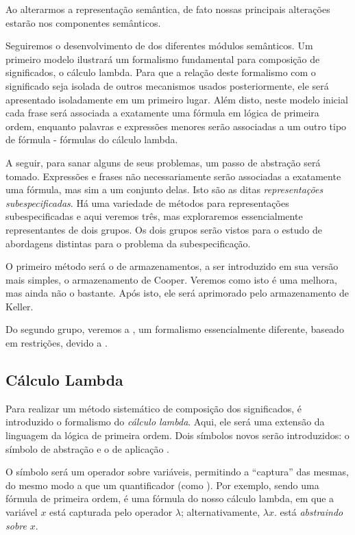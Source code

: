 	Ao alterarmos a representação semântica, de fato nossas principais alterações estarão nos componentes semânticos.
	
	Seguiremos o desenvolvimento de \citet{BlackburnBos:2005} dos diferentes módulos semânticos. Um primeiro modelo ilustrará um formalismo fundamental para composição de significados, o cálculo lambda. Para que a relação deste formalismo com o significado seja isolada de outros mecanismos usados posteriormente, ele será apresentado isoladamente em um primeiro lugar. Além disto, neste modelo inicial cada frase será associada a exatamente uma fórmula em lógica de primeira ordem, enquanto palavras e expressões menores serão associadas a um outro tipo de fórmula - fórmulas do cálculo lambda.
	
	A seguir, para sanar alguns de seus problemas, um passo de abstração será tomado. Expressões e frases não necessariamente serão associadas a exatamente uma fórmula, mas sim a um conjunto delas. Isto são as ditas \textit{representações subespecificadas}. Há uma variedade de métodos para representações subespecificadas e aqui veremos três, mas exploraremos essencialmente representantes de dois grupos. Os dois grupos serão vistos para o estudo de abordagens distintas para o problema da subespecificação. \citep[p.~150--153]{BlackburnBos:2005}
	
	O primeiro método será o de armazenamentos, a ser introduzido em sua versão mais simples, o armazenamento de Cooper. Veremos como isto é uma melhora, mas ainda não o bastante. Após isto, ele será aprimorado pelo armazenamento de Keller.
	
	Do segundo grupo, veremos a , um formalismo essencialmente diferente, baseado em restrições, devido a \citet{HoleSem}.

\subsection{Cálculo Lambda}

Para realizar um método sistemático de composição dos significados, é introduzido o formalismo do \textit{cálculo lambda}. Aqui, ele será uma extensão da linguagem da lógica de primeira ordem. Dois símbolos novos serão introduzidos: o símbolo de abstração \expr{$\lambda$} e o de aplicação .

O símbolo \expr{$\lambda$} será um operador sobre variáveis, permitindo a ``captura'' das mesmas, do mesmo modo a que um quantificador (como \expr{$\forall$}). Por exemplo, sendo  uma fórmula de primeira ordem,  é uma fórmula do nosso cálculo lambda, em que a variável $x$ está capturada pelo operador $\lambda$; alternativamente, $\lambda x.$ está \textsl{abstraindo sobre} $x$. 

